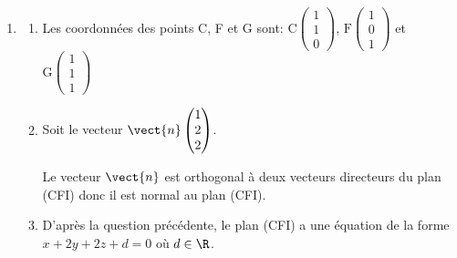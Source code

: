\begin{enumerate}
\item 
	\begin{enumerate}
		\item Les coordonnées des points C, F et G sont:
$\text{C}\begin{pmatrix}1\\1\\0\end{pmatrix}$, $\text{F}\begin{pmatrix}1\\0\\1\end{pmatrix}$ et $\text{G}\begin{pmatrix}1\\1\\1\end{pmatrix}$
		
		\item Soit le vecteur $\vect{n}\begin{pmatrix}1\\2\\2\end{pmatrix}$.%
		

Le vecteur $\vect{n}$ est orthogonal à deux vecteurs directeurs du plan (CFI) donc il est normal au plan (CFI).
	
		\item%
D'après la question précédente, le plan (CFI) a une équation de la forme \\
$x+2y+2z+d=0$ où $d\in\R$.


\end{enumerate}
\end{enumerate}
